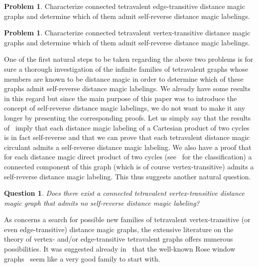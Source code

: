 \documentclass[11 pt,english]{article}
\newtheorem{question}[theorem]{Question}
\theoremstyle{definition}
\newtheorem{problem}[theorem]{Problem}
\begin{document}
\begin{problem}
Characterize connected tetravalent edge-transitive distance magic graphs and determine which of them admit self-reverse distance magic labelings.
\end{problem}

\begin{problem}
Characterize connected tetravalent vertex-transitive distance magic graphs and determine which of them admit self-reverse distance magic labelings.
\end{problem}

One of the first natural steps to be taken regarding the above two problems is for sure a thorough investigation of the infinite families of tetravalent graphs whose members are known to be distance magic in order to determine which of these graphs admit self-reverse distance magic labelings. We already have some results in this regard but since the main purpose of this paper was to introduce the concept of self-reverse distance magic labelings, we do not want to make it any longer by presenting the corresponding proofs. Let us simply say that the results of~\cite{RozSpa24} imply that each distance magic labeling of a Cartesian product of two cycles is in fact self-reverse and that we can prove that each tetravalent distance magic circulant admits a self-reverse distance magic labeling. We also have a proof that for each distance magic direct product of two cycles (see~\cite{AnhCicPetTep15} for the classification) a connected component of this graph (which is of course vertex-transitive) admits a self-reverse distance magic labeling. This thus suggests another natural question.

\begin{question}
Does there exist a connected tetravalent vertex-transitive distance magic graph that admits no self-reverse distance magic labeling?
\end{question}

As concerns a search for possible new families of tetravalent vertex-transitive (or even edge-transitive) distance magic graphs, the extensive literature on the theory of vertex- and/or edge-transitive tetravalent graphs offers numerous possibilities. It was suggested already in~\cite{MikSpa21} that the well-known Rose window graphs~\cite{Wil08} seem like a very good family to start with. 
\end{document}
